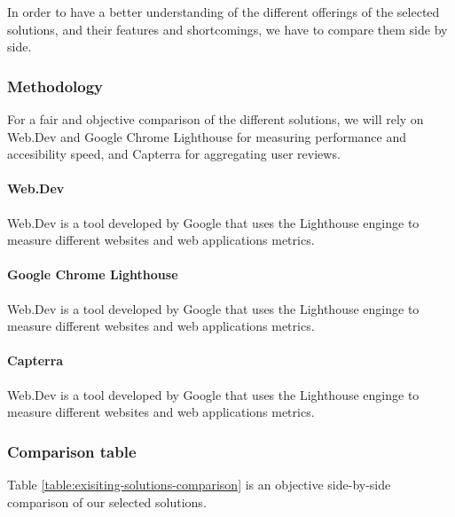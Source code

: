 In order to have a better understanding of the different offerings of the selected solutions, and their features and shortcomings, we have to compare them side by side.

\subsubsection{Methodology}

For a fair and objective comparison of the different solutions, we will rely on Web.Dev and Google Chrome Lighthouse for measuring performance and accesibility speed, and Capterra for aggregating user reviews.

\paragraph{Web.Dev}

Web.Dev is a tool developed by Google that uses the Lighthouse enginge to measure different websites and web applications metrics.

\paragraph{Google Chrome Lighthouse}

Web.Dev is a tool developed by Google that uses the Lighthouse enginge to measure different websites and web applications metrics.

\paragraph{Capterra}

Web.Dev is a tool developed by Google that uses the Lighthouse enginge to measure different websites and web applications metrics.

\subsubsection{Comparison table}

Table \ref{table:exisiting-solutions-comparison} is an objective side-by-side comparison of our selected solutions.

